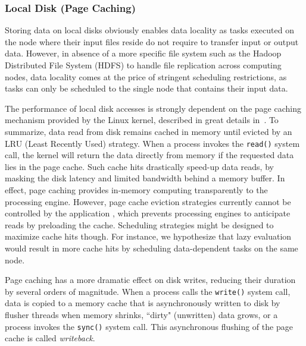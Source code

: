 \documentclass{IEEEtran}
\newcommand{\todo}[1]{\marginpar{\parbox{18mm}{\flushleft\tiny\color{red}\textbf{TODO}:
      #1}}}
\begin{document}
\subsubsection{Local Disk (Page Caching)} %





Storing data on local disks obviously enables data locality as tasks 
executed on the node where their input files reside do not require to 
transfer input or output data. However, in absence of a more specific 
file system such as the Hadoop Distributed File System (HDFS) to handle 
file replication across computing nodes, data locality comes at the price
of stringent scheduling restrictions, as tasks can only be scheduled to the
single node that contains their input data.

The performance of local disk accesses is strongly dependent on the 
page caching mechanism provided by the Linux kernel, described in great 
details in~\cite{love2010linux}. To summarize, data read from disk 
remains cached in memory until evicted by an LRU (Least Recently Used) 
strategy. When a process invokes the \texttt{read()} system call, the 
kernel will return the data directly from memory if the requested data 
lies in the page cache. Such cache hits drastically speed-up data 
reads, by masking the disk latency and limited bandwidth behind a 
memory buffer. In effect, page caching provides in-memory computing 
transparently to the processing engine. However, page cache eviction 
strategies currently cannot be controlled by the application 
\todo{check that}, which prevents processing engines to anticipate 
reads by preloading the cache. Scheduling strategies might be designed 
to maximize cache hits though. For instance, we hypothesize that lazy 
evaluation would result in more cache hits by scheduling data-dependent 
tasks on the same node.

Page caching has a more dramatic effect on disk writes, reducing their 
duration by several orders of magnitude. When a process calls the 
\texttt{write()} system call, data is copied to a memory cache that is 
asynchronously written to disk by flusher threads when memory shrinks, 
``dirty" (unwritten) data grows, or a 
process invokes the \texttt{sync()} system call. 
This asynchronous flushing of the page cache is called 
\emph{writeback}.
\end{document}
